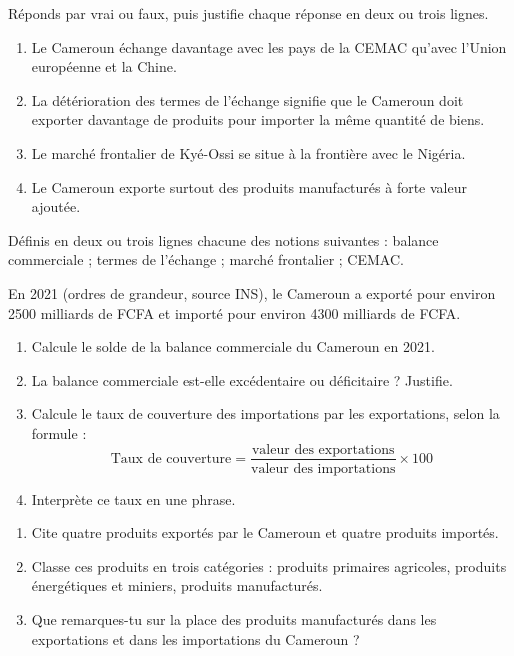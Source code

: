 \documentclass[11pt]{article}
\newcommand{\cle}[1]{{\popxbold\color{popdark}#1}}
\newcounter{popsec}
\newcounter{popsub}
\newcommand{\courssub}[1]{%
  \stepcounter{popsub}%
  \par\vspace{9pt}\noindent{\popxbold\fontsize{11.5}{13}\selectfont\color{popink}{\color{poporange}\thepopsec.\thepopsub}\hspace{6pt}#1}\par\nopagebreak\vspace{4pt}
}
\begin{document}
\begin{exercice}
Réponds par vrai ou faux, puis justifie chaque réponse en deux ou trois lignes.
\begin{enumerate}
\item Le Cameroun échange davantage avec les pays de la CEMAC qu'avec l'Union européenne et la Chine.
\item La détérioration des termes de l'échange signifie que le Cameroun doit exporter davantage de produits pour importer la même quantité de biens.
\item Le marché frontalier de Kyé-Ossi se situe à la frontière avec le Nigéria.
\item Le Cameroun exporte surtout des produits manufacturés à forte valeur ajoutée.
\end{enumerate}
\end{exercice}

\begin{exercice}
Définis en deux ou trois lignes chacune des notions suivantes : \cle{balance commerciale} ; \cle{termes de l'échange} ; \cle{marché frontalier} ; \cle{CEMAC}.
\end{exercice}

\begin{exercice}
En 2021 (ordres de grandeur, source INS), le Cameroun a exporté pour environ \num{2500} milliards de FCFA et importé pour environ \num{4300} milliards de FCFA.
\begin{enumerate}
\item Calcule le solde de la balance commerciale du Cameroun en 2021.
\item La balance commerciale est-elle excédentaire ou déficitaire ? Justifie.
\item Calcule le taux de couverture des importations par les exportations, selon la formule :
\[ \text{Taux de couverture} = \frac{\text{valeur des exportations}}{\text{valeur des importations}} \times 100 \]
\item Interprète ce taux en une phrase.
\end{enumerate}
\end{exercice}

\courssub{Je m'entraîne}

\begin{exercice}
\begin{enumerate}
\item Cite quatre produits exportés par le Cameroun et quatre produits importés.
\item Classe ces produits en trois catégories : produits primaires agricoles, produits énergétiques et miniers, produits manufacturés.
\item Que remarques-tu sur la place des produits manufacturés dans les exportations et dans les importations du Cameroun ?
\end{enumerate}
\end{exercice}
\end{document}
